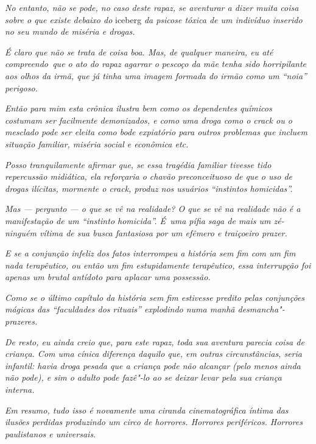 \emph{No entanto, não se pode, no caso deste rapaz, se aventurar a dizer
muita coisa sobre o que existe debaixo do} iceberg \emph{da psicose tóxica de
um indivíduo inserido no seu mundo de miséria e drogas.}

\emph{É claro que não se trata de coisa boa. Mas, de qualquer maneira,
eu até compreendo~que o ato do rapaz agarrar o pescoço da mãe tenha sido
horripilante aos olhos da irmã, que já tinha uma imagem formada do irmão
como um ``noia'' perigoso.}

\emph{Então para mim esta crônica ilustra bem como os dependentes
químicos costumam ser facilmente demonizados, e como uma droga como o
crack ou o mesclado pode ser eleita como bode expiatório para outros
problemas que incluem situação familiar, miséria social e econômica
etc.}

\emph{Posso tranquilamente afirmar que, se essa tragédia familiar
tivesse tido repercussão midiática, ela reforçaria o chavão
preconceituoso de que o uso de drogas ilícitas, mormente o crack, produz
nos usuários ``instintos homicidas''.}

\emph{Mas --- pergunto --- o que se vê na realidade? O que se vê na
realidade não é a manifestação de um ``instinto homicida''. É~uma pífia
saga de mais um zé-ninguém vítima de sua busca fantasiosa por um efêmero
e traiçoeiro prazer.}

\emph{E se a conjunção infeliz dos fatos interrompeu a história sem fim
com um fim nada terapêutico, ou então um fim estupidamente terapêutico,
essa interrupção foi apenas um brutal antídoto para aplacar uma
possessão.}

\emph{Como se o último capítulo da história sem fim estivesse predito
pelas conjunções mágicas das ``faculdades dos rituais'' explodindo numa
manhã desmancha"-prazeres.}

\emph{De resto, eu ainda creio que, para este rapaz, toda sua aventura
parecia coisa de criança. Com uma cínica diferença daquilo que, em
outras circunstâncias, seria infantil: havia droga pesada que a criança
pode não alcançar (pelo menos ainda não pode), e sim o adulto pode
fazê"-lo ao se deixar levar pela sua criança interna.}

\emph{Em resumo, tudo isso é novamente uma ciranda cinematográfica
íntima das ilusões perdidas produzindo um circo de horrores. Horrores
periféricos. Horrores paulistanos e universais.}
